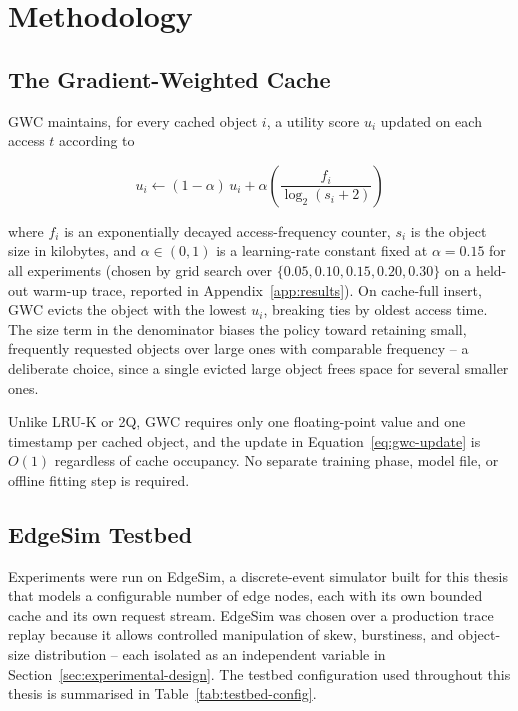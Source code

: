 \chapter{Methodology}
\label{ch:methodology}

\section{The Gradient-Weighted Cache}
\label{sec:gwc-design}
GWC maintains, for every cached object $i$, a utility score $u_i$ updated on each access
$t$ according to

\begin{equation}
  u_i \leftarrow (1 - \alpha)\, u_i + \alpha \left( \frac{f_i}{\log_2(s_i + 2)} \right)
  \label{eq:gwc-update}
\end{equation}

\noindent where $f_i$ is an exponentially decayed access-frequency counter, $s_i$ is the
object size in kilobytes, and $\alpha \in (0,1)$ is a learning-rate constant fixed at
$\alpha = 0.15$ for all experiments (chosen by grid search over $\{0.05, 0.10, 0.15, 0.20,
0.30\}$ on a held-out warm-up trace, reported in Appendix~\ref{app:results}). On cache-full
insert, GWC evicts the object with the lowest $u_i$, breaking ties by oldest access time.
The size term in the denominator biases the policy toward retaining small, frequently
requested objects over large ones with comparable frequency -- a deliberate choice, since a
single evicted large object frees space for several smaller ones.

Unlike LRU-K or 2Q, GWC requires only one floating-point value and one timestamp per cached
object, and the update in Equation~\ref{eq:gwc-update} is $O(1)$ regardless of cache
occupancy. No separate training phase, model file, or offline fitting step is required.

\section{EdgeSim Testbed}
Experiments were run on EdgeSim, a discrete-event simulator built for this thesis that models
a configurable number of edge nodes, each with its own bounded cache and its own request
stream. EdgeSim was chosen over a production trace replay because it allows controlled
manipulation of skew, burstiness, and object-size distribution -- each isolated as an
independent variable in Section~\ref{sec:experimental-design}. The testbed configuration used
throughout this thesis is summarised in Table~\ref{tab:testbed-config}.

